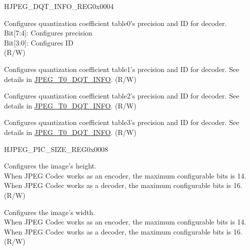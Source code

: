 \begin{register}{H}{JPEG\_DQT\_INFO\_REG}{0x0004}\label{regdesc:JPEGDQTINFOREG}
%
%
%
%
\regnewline%
\begin{regdesc}\begin{reglist}
\label{fielddesc:JPEGT0DQTINFO}\item [JPEG\_T0\_DQT\_INFO] Configures quantization coefficient table0's precision and ID for decoder.\\
Bit[7:4]: Configures precision\\
Bit[3:0]: Configures ID\\
(R/W)
\label{fielddesc:JPEGT1DQTINFO}\item [JPEG\_T1\_DQT\_INFO] Configures quantization coefficient table1's precision and ID for decoder. See details in \hyperref[fielddesc:JPEGT0DQTINFO]{JPEG\_T0\_DQT\_INFO}. (R/W)\\
\label{fielddesc:JPEGT2DQTINFO}\item [JPEG\_T2\_DQT\_INFO] Configures quantization coefficient table2's precision and ID for decoder. See details in \hyperref[fielddesc:JPEGT0DQTINFO]{JPEG\_T0\_DQT\_INFO}. (R/W)\\
\label{fielddesc:JPEGT3DQTINFO}\item [JPEG\_T3\_DQT\_INFO] Configures quantization coefficient table3's precision and ID for decoder. See details in \hyperref[fielddesc:JPEGT0DQTINFO]{JPEG\_T0\_DQT\_INFO}. (R/W)\\
\end{reglist}\end{regdesc}
\end{register}


\begin{register}{H}{JPEG\_PIC\_SIZE\_REG}{0x0008}\label{regdesc:JPEGPICSIZEREG}
%
%
\regnewline%
\begin{regdesc}\begin{reglist}
\label{fielddesc:JPEGVA}\item [JPEG\_VA] Configures the image's height. \\
When JPEG Codec works as an encoder, the maximum configurable bits is 14.\\
When JPEG Codec works as a decoder, the maximum configurable bits is 16.\\
 (R/W)
\label{fielddesc:JPEGHA}\item [JPEG\_HA] Configures the image's width. \\
When JPEG Codec works as an encoder, the maximum configurable bits is 14.\\
When JPEG Codec works as a decoder, the maximum configurable bits is 16.\\
 (R/W)
\end{reglist}\end{regdesc}
\end{register}


